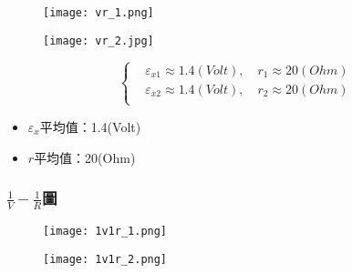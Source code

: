 \documentclass[12pt]{article}
\begin{document}
                \begin{figure}[h]
                    \begin{minipage}{0.49\textwidth}
                        \centering

                        \texttt{[image: vr\_1.png]}
                        \caption{}
                        \label{fig:vr_1}
                    \end{minipage}
                    \begin{minipage}{0.49\textwidth}
                        \centering

                        \texttt{[image: vr\_2.jpg]}
                        \caption{}
                        \label{fig:vr_2}
                    \end{minipage}
                \end{figure}

                $$
                \begin{cases}
                    &\varepsilon_{x1}\approx 1.4(Volt),\quad r_1\approx 20(Ohm)\\
                    &\varepsilon_{x2}\approx 1.4(Volt),\quad r_2\approx 20(Ohm)\\
                \end{cases}
                $$
                \begin{itemize}
                    \item $\varepsilon_{x}$平均值：1.4(Volt)
                    \item $r$平均值：20(Ohm)
                \end{itemize}

                \subsubsection{$\frac{1}{V}-\frac{1}{R}$圖}

                \begin{figure}[h]
                    \begin{minipage}{0.49\textwidth}
                        \centering

                        \texttt{[image: 1v1r\_1.png]}
                        \caption{}
                        \label{fig:1v1r_1}
                    \end{minipage}
                    \begin{minipage}{0.49\textwidth}
                        \centering

                        \texttt{[image: 1v1r\_2.png]}
                        \caption{}
                        \label{fig:1v1r_2}
                    \end{minipage}
                \end{figure}
\end{document}
